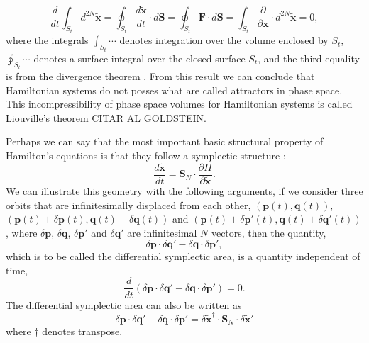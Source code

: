 \begin{equation}
\frac{d}{dt}\int_{S_t}d^{2N}\tilde{\bm{x}}= \oint_{S_t}\frac{d\tilde{\bm{x}}}{dt}\cdot d\bm{S}=\oint_{S_t}\bm{F}\cdot d\bm{S}=\int_{S_t}\frac{\partial }{\partial \tilde{\bm{x}}}\cdot d^{2N}\tilde{\bm{x}}=0,
\end{equation}
where the integrals $\int_{S_t} \cdots$ denotes integration over the volume enclosed by $S_t$, $ \oint_{S_t}\cdots$ denotes a surface integral over the closed surface $S_t$, and the third equality is from the divergence theorem \cite{ottChaosDynamicalSystems2002}. From this result we can conclude that Hamiltonian systems do not posses what are called attractors in phase space. This incompressibility of phase space volumes for Hamiltonian systems is called Liouville's theorem \cite{ottChaosDynamicalSystems2002}
CITAR AL GOLDSTEIN.\par

Perhaps we can say that the most important basic structural property of Hamilton's equations is that they follow a symplectic structure \cite{ottChaosDynamicalSystems2002}:
\begin{equation}
\frac{d\tilde{\bm{x}}}{dt}=\bm{S}_N\cdot \frac{\partial H}{\partial \tilde{\bm{x}}}.
\end{equation}
We can illustrate this geometry with the following arguments, if we consider three orbits that are infinitesimally displaced from each other, $(\bm{p}(t),\bm{q}(t))$, $(\bm{p}(t)+\delta \bm{p}(t),\bm{q}(t)+\delta \bm{q}(t))$ and $(\bm{p}(t)+\delta \bm{p}'(t),\bm{q}(t)+\delta \bm{q}'(t))$, where $\delta \bm{p}$, $\delta \bm{q}$, $\delta \bm{p}'$ and $\delta \bm{q}'$ are infinitesimal $N$ vectors, then the quantity,
\begin{equation}
\delta \bm{p}\cdot \delta \bm{q}'-\delta \bm{q}\cdot \delta \bm{p}',
\end{equation}
which is to be called the differential symplectic area, is a quantity independent of time,
\begin{equation}
\frac{d}{dt}(\delta\bm{p}\cdot\delta\bm{q}'-\delta\bm{q}\cdot\delta\bm{p}')=0.
\label{eq:sympl_area_no_time}
\end{equation}
The differential symplectic area can also be written as
\begin{equation}
\delta\bm{p}\cdot\delta\bm{q}'-\delta\bm{q}\cdot\delta\bm{p}'=\delta\tilde{\bm{x}}^{\dagger}\cdot\bm{S}_N\cdot \delta \tilde{\bm{x}}'
\label{eq:sympl_area_matrix}
\end{equation}
where $\dagger$ denotes transpose.\par

